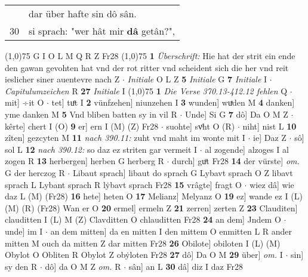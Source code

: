 \documentclass[8pt,a4paper,notitlepage]{article}
\begin{document}
\begin{table}[ht]
\begin{minipage}[t]{0.5\linewidth}
\begin{tabular}{rl}
 & dar über hafte sin dô sân.\\ 
30 & si sprach: "wer hât mir \textbf{dâ} getân?",\\ 
\end{tabular}
\scriptsize
\line(1,0){75} \newline
G I O L M Q R Z Fr28 \newline
\line(1,0){75} \newline
\textbf{1} \textit{Überschrift:} Hie hat der strit ein ende den gawan gevohten hat vnd der rot ritter vnd scheident sich die her vnd reit ieslicher siner auentevre nach Z   $\cdot$ \textit{Initiale} O L Z  \textbf{5} \textit{Initiale} G  \textbf{7} \textit{Initiale} I   $\cdot$ \textit{Capitulumzeichen} R  \textbf{27} \textit{Initiale} I  \newline
\line(1,0){75} \newline
\textbf{1} \textit{Die Verse 370.13-412.12 fehlen} Q   $\cdot$ mit] ÷it O  $\cdot$ tet] tuͤt I \textbf{2} vünfzehen] niunzehen I \textbf{3} wunden] wuͯden M \textbf{4} danken] yme danken M \textbf{5} Vnd bliben batten sy in vil R  $\cdot$ Unde] Si G \textbf{7} dô] Da O M Z  $\cdot$ kêrte] chert I (O) \textbf{9} er] ern I (M) (Z) Fr28  $\cdot$ suohte] svͦht O (R)  $\cdot$ niht] nist L \textbf{10} zîten] gezcyten M \textbf{11} \textit{nach 390.11:} zuht vnd maht im wonte mit I   $\cdot$ ie] Daz Z  $\cdot$ sô] sol L \textbf{12} \textit{nach 390.12:} so daz ez striten gar vermeit I   $\cdot$ al zogende] alzoges I al zogen R \textbf{13} herbergen] herben G herberg R  $\cdot$ durch] guͦt Fr28 \textbf{14} der vürste] \textit{om.} G der herczog R  $\cdot$ Libaut sprach] libaut do sprach G Lybavt sprach O Z libavt sprach L Lybant sprach R lẏbavt sprach Fr28 \textbf{15} vrâgte] fragt O  $\cdot$ wiez dâ] wie daz L (M) (Fr28) \textbf{16} hete] heten O \textbf{17} Melianz] Melyanz O \textbf{19} ez] wande ez I (L) (M) (R) (Fr28) Wan er O \textbf{20} ermel] ermeln Z \textbf{21} zerren] zerten Z \textbf{23} Clauditen] clauditten I (L) M (Z) Clavditten O chlauditten Fr28 \textbf{24} an dem] Jndem O  $\cdot$ unde] im I  $\cdot$ an dem mitten] da en mitten I den mittem O enmitten L R ander mitten M ouch da mitten Z dar mitten Fr28 \textbf{26} Obilote] obiloten I (L) (M) Obylot O Obliten R Obylot Z obẏloten Fr28 \textbf{27} dô] Da O M \textbf{29} über] \textit{om.} I  $\cdot$ sin] sy den R  $\cdot$ dô] da O M Z \textit{om.} R  $\cdot$ sân] an L \textbf{30} dâ] diz I daz Fr28 \newline
\end{minipage}
\hspace{0.5cm}

\end{table}
\end{document}
